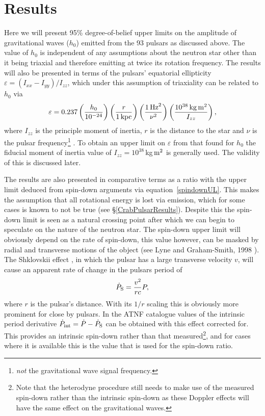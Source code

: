 \section{Results}\label{results}
Here we will present 95\% degree-of-belief upper limits on the amplitude of gravitational waves
($h_0$) emitted from the 93 pulsars as discussed above. The value of $h_0$ is independent of any
assumptions about the neutron star other than it being triaxial and therefore emitting \gws at twice
its rotation frequency. The results will also be presented in terms of the pulsars' equatorial
ellipticity $\varepsilon = (I_{xx} - I_{yy})/I_{zz}$, which under this assumption of triaxiality can
be related to $h_0$ via
\begin{equation}\label{h0epsilon}
\varepsilon = 0.237\left(\frac{h_0}{10^{-24}}\right)\left(\frac{r}{1\,{\rm
kpc}}\right)\left(\frac{1\,{\rm Hz}^2}{\nu^2}\right)\left(\frac{10^{38}\,{\rm kg}\,{\rm
m}^2}{I_{zz}}\right),
\end{equation}
where $I_{zz}$ is the principle moment of inertia, $r$ is the distance to the star and $\nu$ is the
pulsar frequency\footnote{{\it not} the gravitational wave signal frequency.} \cite{Abbott:2005}. To
obtain an upper limit on $\varepsilon$ from that found for $h_0$ the fiducial moment of inertia
value of $I_{zz} = 10^{38}$\,kg\,${\rm m}^2$ is generally used. The validity of this is discussed
later.

The results are also presented in comparative terms as a ratio with the upper limit deduced
from spin-down arguments via equation~\ref{spindownUL}. This makes the assumption that all
rotational energy is lost via \gw emission, which for some cases is known to not be true (see
\S\ref{CrabPulsarResults}). Despite this the spin-down limit is seen as a natural crossing point
after which we can begin to speculate on the nature of the neutron star. The spin-down upper limit
will obviously depend on the rate of spin-down, this value however, can be masked by radial
and transverse motions of the object (see Lyne and Graham-Smith, 1998 \cite{PulsarAstronomy}). The
Shklovskii effect \cite{Shklovskii:1970}, in which the pulsar has a large transverse velocity $v$,
will cause an apparent rate of change in the pulsars period of
\begin{equation}\label{ShklovskiiEffect}
\dot{P}_{\rm S} = \frac{v^2}{rc}P,
\end{equation}
where $r$ is the pulsar's distance. With its $1/r$ scaling this is obviously more prominent for
close by pulsars. In the ATNF catalogue \cite{ATNF} values of the intrinsic period
derivative $\dot{P}_{\rm int} = \dot{P}-\dot{P}_{\rm S}$ can be obtained with this effect corrected
for. This provides an intrinsic spin-down rather than that measured\footnote{Note that the
heterodyne procedure still needs to make use of the measured spin-down rather than the intrinsic
spin-down as these Doppler effects will have the same effect on the gravitational waves.}, and for
cases where it is available this is the value that is used for the spin-down ratio.

